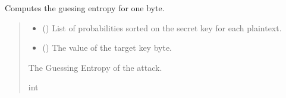 \documentclass[letterpaper,10pt,english]{sphinxmanual}
\begin{document}
\begin{fulllineitems}
\begin{fulllineitems}
\begin{quote}
\begin{description}
\begin{itemize}
\end{itemize}

\end{description}\end{quote}

\end{fulllineitems}


\begin{fulllineitems}
\label{\detokenize{MLSCAlib.Attacks:MLSCAlib.Attacks.attack.Attack.get_GE}}
\pysigstartsignatures
{}
\pysigstopsignatures
\sphinxAtStartPar
Computes the guesing entropy for one byte.
\begin{quote}\begin{description}
\begin{itemize}
\item {} 
\sphinxAtStartPar
{} (\sphinxstyleliteralemphasis{\sphinxupquote{{[}}}\sphinxstyleliteralemphasis{\sphinxupquote{{[}}}\sphinxstyleliteralemphasis{\sphinxupquote{{]}}}\sphinxstyleliteralemphasis{\sphinxupquote{{]}}}) \textendash{} List of probabilities sorted on the secret key for each plaintext.

\item {} 
\sphinxAtStartPar
{} () \textendash{} The value of the target key byte.

\end{itemize}

\sphinxAtStartPar
The Guessing Entropy of the attack.

\sphinxAtStartPar
int

\end{description}\end{quote}

\end{fulllineitems}



\end{fulllineitems}
\end{document}
